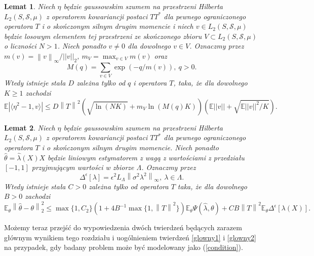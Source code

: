 \documentclass{mwart}
\newtheorem{lm}{Lemat}
\newcommand{\norm}[1]{\left\lVert#1\right\rVert}
\begin{document}
\begin{lm}\label{lem5}
Niech $\eta$ będzie gaussowskim  szumem na przestrzeni Hilberta $L_2(S,\mathcal{S},\mu)$ z operatorem kowariancji postaci $TT^*$ dla pewnego ograniczonego operatora $T$ i o skończonym silnym drugim momencie i niech $v\in L_2(S,\mathcal{S},\mu)$ będzie losowym elementem tej przestrzeni ze skończonego zbioru $V\subset L_2(S,\mathcal{S},\mu)$ o liczności $N>1$. Niech ponadto $v\neq 0$ dla dowolnego $v\in V$. Oznaczmy przez $m(v)=\norm{v}_{\infty}/||v||_2$, $m_V=\max_{v\in V}m(v)$ oraz 
\begin{displaymath}
M(q)=\sum_{v\in V}\exp (-q/m(v)),\ q>0.
\end{displaymath}
Wtedy istnieje stała $D$ zależna tylko od $q$ i operatora $T$, taka, że dla dowolnego $K\geq 1$ zachodzi
\begin{displaymath}
\mathbb{E}\left|\langle \eta^2-1, v\rangle\right|\leq D\norm{T}^2\left(\sqrt{\ln (NK)}+m_V\ln (M(q)K)\right)\left(\mathbb{E}||v||+\sqrt{\mathbb{E}||v||^2/K}\right).
\end{displaymath}
\end{lm}
\begin{lm}\label{lem6}
Niech $\eta$ będzie gaussowskim  szumem na przestrzeni Hilberta $L_2(S,\mathcal{S},\mu)$ z operatorem kowariancji postaci $TT^*$ dla pewnego ograniczonego operatora $T$ i o skończonym silnym drugim momencie. Niech ponadto $\hat{\theta}=\hat{\lambda}(X)X$ będzie liniowym estymatorem z wagą z wartościami z przedziału $[-1,1]$ przyjmującym wartości w zbiorze $\Lambda$. Oznaczmy przez 
\begin{displaymath}
\Delta^{\epsilon}[\lambda]=\epsilon^2L_{\Lambda}\norm{\sigma^2\lambda^2}_{\infty},\ \lambda\in \Lambda.
\end{displaymath}
Wtedy istnieje stała $C>0$ zależna tylko od operatora $T$ taka, że dla dowolnego $B>0$ zachodzi
\begin{displaymath}
\mathbb{E}_{\theta}\norm{\hat{\theta}-\theta}_2^2\leq \max\{1,C_2\}(1+4B^{-1}\max\{1,\norm{T}^2\})\mathbb{E}_{\theta}\Psi(\hat{\lambda},\theta)+CB\norm{T}^2\mathbb{E}_{\theta}\Delta^{\epsilon}[\lambda (X)].
\end{displaymath}
\end{lm}

Możemy teraz przejść do wypowiedzenia dwóch twierdzeń będących zarazem głównym wynikiem tego rozdziału i uogólnieniem twierdzeń \ref{glowny1} i \ref{glowny2} na przypadek, gdy badany problem może być modelowany jako (\ref{condition}). 
\end{document}

